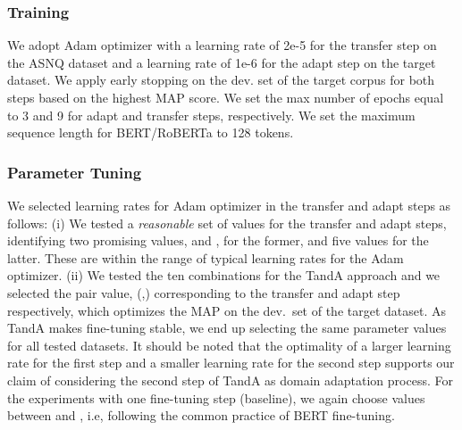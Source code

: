 \documentclass[letterpaper]{article} \usepackage{aaai20}  \usepackage{times}  \usepackage{helvet} \usepackage{courier}  \usepackage[hyphens]{url}  \usepackage{graphicx} \urlstyle{rm} \def\UrlFont{\rm}  \usepackage{graphicx}  \usepackage{todonotes}
\newcommand{\TANDA}{T{\sc and}A}
\begin{document}
\subsubsection{Training} 
We adopt Adam optimizer \cite{Kingma2014AdamAM} with a learning rate of 2e-5 for the transfer step on the ASNQ dataset and a learning rate of 1e-6 for the adapt step on the target dataset. 
We apply early stopping on the dev. set of the target corpus for both steps based on the highest MAP score. We set the max number of epochs equal to 3 and 9 for adapt and transfer steps, respectively.
We set the maximum sequence length for BERT/RoBERTa to 128 tokens.


\subsubsection{Parameter Tuning} 
We selected learning rates for Adam optimizer in the transfer and adapt steps as follows: (i) We tested a \emph{reasonable} set of values for the transfer and adapt steps, identifying two promising values,  and , for the former, and five values  for the latter. These are within the range of typical learning rates for the Adam optimizer. (ii) We tested the ten combinations for the {\TANDA} approach and we selected the pair value, (,) corresponding to the transfer and adapt step respectively, which optimizes the MAP on the dev.~set of the target dataset. As {\TANDA} makes fine-tuning stable, we end up selecting the same parameter values for all tested datasets. It should be noted that the optimality of a larger learning rate for the first step and a smaller learning rate for the second step supports our claim of considering the second step of {\TANDA} as domain adaptation process.
For the experiments with one fine-tuning step (baseline), we again choose values between  and , i.e, following the common practice of BERT fine-tuning. 
\end{document}
